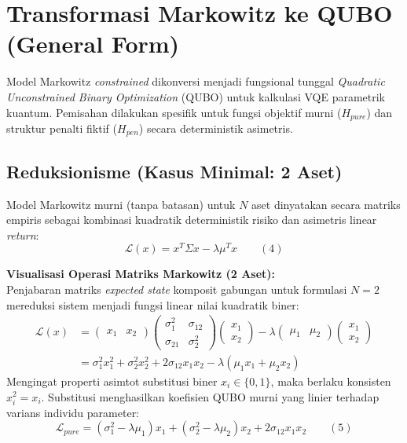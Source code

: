 \hypertarget{transformasi-markowitz-ke-qubo-general-form}{%
\section{Transformasi Markowitz ke QUBO (General Form)}\label{transformasi-markowitz-ke-qubo-general-form}}

Model Markowitz \emph{constrained} dikonversi menjadi fungsional tunggal \emph{Quadratic Unconstrained Binary Optimization} (QUBO) untuk kalkulasi VQE parametrik kuantum. Pemisahan dilakukan spesifik untuk fungsi objektif murni (\(H_{pure}\)) dan struktur penalti fiktif (\(H_{pen}\)) secara deterministik asimetris.

\subsection{Reduksionisme (Kasus Minimal: 2 Aset)}
Model Markowitz murni (tanpa batasan) untuk $N$ aset dinyatakan secara matriks empiris sebagai kombinasi kuadratik deterministik risiko dan asimetris linear \emph{return}:
\[ \mathcal{L}(x) = x^T \Sigma x - \lambda \mu^T x \qquad (4) \]

\textbf{Visualisasi Operasi Matriks Markowitz (2 Aset):} \\
Penjabaran matriks \emph{expected state} komposit gabungan untuk formulasi $N=2$ mereduksi sistem menjadi fungsi linear nilai kuadratik biner:
\begin{equation}
\begin{split} 
\mathcal{L}(x) &= \begin{pmatrix} x_1 & x_2 \end{pmatrix} \begin{pmatrix} \sigma_1^2 & \sigma_{12} \\ \sigma_{21} & \sigma_2^2 \end{pmatrix} \begin{pmatrix} x_1 \\ x_2 \end{pmatrix} - \lambda \begin{pmatrix} \mu_1 & \mu_2 \end{pmatrix} \begin{pmatrix} x_1 \\ x_2 \end{pmatrix} \\
&= \sigma_1^2 x_1^2 + \sigma_2^2 x_2^2 + 2\sigma_{12}x_1 x_2 - \lambda(\mu_1 x_1 + \mu_2 x_2)
\end{split} 
\end{equation}
Mengingat properti asimtot substitusi biner $x_i \in \{0, 1\}$, maka berlaku konsisten $x_i^2 = x_i$. Substitusi menghasilkan koefisien QUBO murni yang linier terhadap varians individu parameter:
\[ \mathcal{L}_{pure} = (\sigma_1^2 - \lambda \mu_1) x_1 + (\sigma_2^2 - \lambda \mu_2) x_2 + 2\sigma_{12}x_1 x_2 \qquad (5) \]

